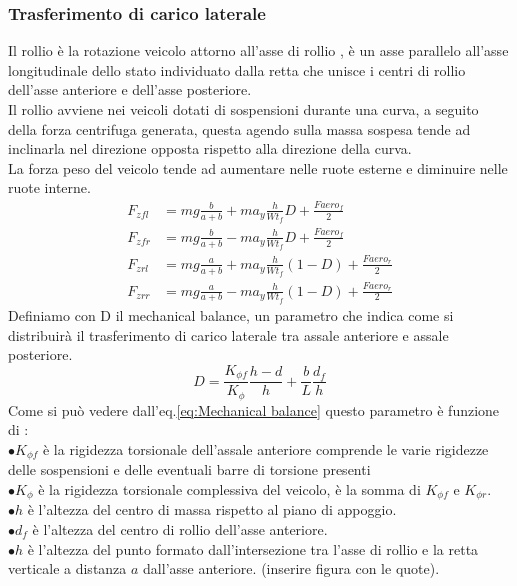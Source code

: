 \subsubsection{Trasferimento di carico laterale}
Il rollio è la rotazione veicolo attorno all'asse di rollio , è un asse parallelo all'asse longitudinale dello stato individuato dalla retta che unisce i centri di rollio dell'asse anteriore e dell'asse posteriore.\\
Il rollio avviene nei veicoli dotati di sospensioni durante una curva, a seguito della forza centrifuga generata, questa agendo sulla massa sospesa tende ad inclinarla nel direzione opposta rispetto alla direzione della curva.\\
La forza peso del veicolo tende ad aumentare nelle ruote esterne e diminuire nelle ruote interne.\\
\begin{align}
F_{zfl} & = mg \frac{b}{a+b} + m a_y \frac{h}{Wt_f} D + \frac{Faero_f}{2}\\
F_{zfr} & = mg \frac{b}{a+b} - m a_y \frac{h}{Wt_f} D + \frac{Faero_f}{2}\\
F_{zrl} & = mg \frac{a}{a+b} + m a_y \frac{h}{Wt_f} (1-D) + \frac{Faero_r}{2}\\
F_{zrr} & = mg \frac{a}{a+b} - m a_y \frac{h}{Wt_f} (1-D) + \frac{Faero_r}{2}
\end{align}
Definiamo con D il mechanical balance, un parametro che indica come si distribuirà il trasferimento di carico laterale tra assale anteriore e assale posteriore.
\begin{equation}
    D = \frac{K_{\phi f}}{K_\phi}\frac{h-d}{h} + \frac{b}{L} \frac{d_f}{h} \label{eq:Mechanical balance}
\end{equation}
Come si può vedere dall'eq.\ref{eq:Mechanical balance} questo parametro è funzione di :\\
$\bullet K_{\phi f}$ è la rigidezza torsionale dell'assale anteriore comprende le varie rigidezze delle sospensioni e delle eventuali barre di torsione presenti\\
$\bullet K_{\phi}$ è la rigidezza torsionale complessiva del veicolo, è la somma di $K_{\phi f}$ e $K_{\phi r}$.\\
$\bullet h$ è l'altezza del centro di massa rispetto al piano di appoggio.\\
$\bullet d_f$ è l'altezza del centro di rollio dell'asse anteriore.\\
$\bullet h$ è l'altezza del punto formato dall'intersezione tra l'asse di rollio e la retta verticale a distanza $a$ dall'asse anteriore.
(inserire figura con le quote).

